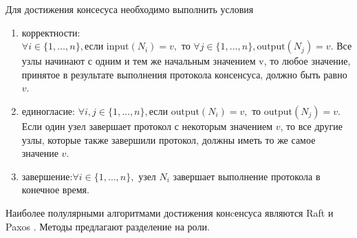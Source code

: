 Для достижения консесуса необходимо выполнить условия \begin{enumerate}
    \item корректности: $\forall i \in \{1, \ldots, n\}, \text{если } \text{input}(N_i) = v, \text{ то } \forall j \in \{1, \ldots, n\}, \text{output}(N_j) = v$.
     Все узлы начинают с одним и тем же начальным значением v, то любое значение, принятое в результате выполнения протокола консенсуса, должно быть равно \( v \).
    \item единогласие: $\forall i, j \in \{1, \ldots, n\}, \text{если } \text{output}(N_i) = v, \text{ то } \text{output}(N_j) = v$.
     Если один узел завершает протокол с некоторым значением \( v \), то все другие узлы, которые также завершили протокол, должны иметь то же самое значение \( v \).
    \item завершение:$\forall i \in \{1, \ldots, n\}, \text{ узел } N_i$ 
    завершает выполнение протокола в конечное время.
\end{enumerate}

Наиболее полулярными алгоритмами достижения конcенсуса являются Raft \cite{lamport2019time} и Paxos \cite{pease1980reaching}. Методы
предлагают разделение на роли.

